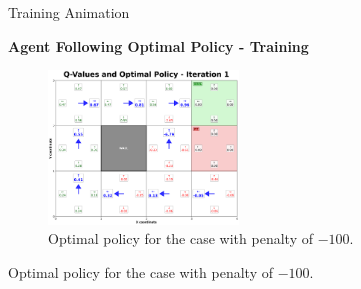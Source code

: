 \documentclass[aspectratio=169]{beamer}
\begin{document}
\begin{frame}{Training Animation}
    \begin{center}
        \textbf{Agent Following Optimal Policy - Training}
        \vspace{0.5cm}
        
        
                    \begin{figure}[h]
                \centering
                \includegraphics[width=0.45\textwidth]{./Results/optimal_policy_reward_minus_100.png}
                \caption{Optimal policy for the case with penalty of $-100$.}
            \end{figure}
        
        
        \vspace{0.3cm}
        \small{
       Optimal policy for the case with penalty of $-100$.}
    \end{center}
\end{frame}
\end{document}
